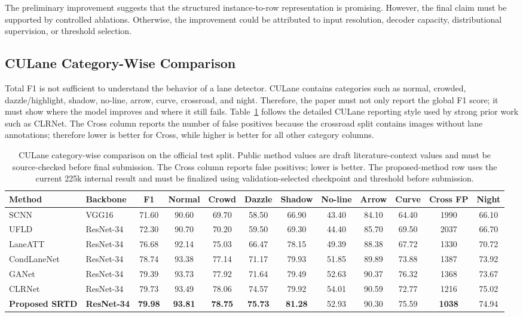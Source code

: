 \documentclass[conference]{IEEEtran}
\newcommand{\method}{SRTD}
\begin{document}
The preliminary improvement suggests that the structured instance-to-row representation is promising. However, the final claim must be supported by controlled ablations. Otherwise, the improvement could be attributed to input resolution, decoder capacity, distributional supervision, or threshold selection.

\subsection{CULane Category-Wise Comparison}

Total F1 is not sufficient to understand the behavior of a lane detector. CULane contains categories such as normal, crowded, dazzle/highlight, shadow, no-line, arrow, curve, crossroad, and night. Therefore, the paper must not only report the global F1 score; it must show where the model improves and where it still fails. Table~\ref{tab:category} follows the detailed CULane reporting style used by strong prior work such as CLRNet. The Cross column reports the number of false positives because the crossroad split contains images without lane annotations; therefore lower is better for Cross, while higher is better for all other category columns.

\begin{table}[t]
\centering
\caption{CULane category-wise comparison on the official test split. Public method values are draft literature-context values and must be source-checked before final submission. The Cross column reports false positives; lower is better. The proposed-method row uses the current 225k internal result and must be finalized using validation-selected checkpoint and threshold before submission.}
\label{tab:category}
\scriptsize
\setlength{\tabcolsep}{2.5pt}
\begin{tabular}{llcccccccccc}
\toprule
Method & Backbone & F1 & Normal & Crowd & Dazzle & Shadow & No-line & Arrow & Curve & Cross FP & Night \\
\midrule
SCNN & VGG16 & 71.60 & 90.60 & 69.70 & 58.50 & 66.90 & 43.40 & 84.10 & 64.40 & 1990 & 66.10 \\
UFLD & ResNet-34 & 72.30 & 90.70 & 70.20 & 59.50 & 69.30 & 44.40 & 85.70 & 69.50 & 2037 & 66.70 \\
LaneATT & ResNet-34 & 76.68 & 92.14 & 75.03 & 66.47 & 78.15 & 49.39 & 88.38 & 67.72 & 1330 & 70.72 \\
CondLaneNet & ResNet-34 & 78.74 & 93.38 & 77.14 & 71.17 & 79.93 & 51.85 & 89.89 & 73.88 & 1387 & 73.92 \\
GANet & ResNet-34 & 79.39 & 93.73 & 77.92 & 71.64 & 79.49 & 52.63 & 90.37 & 76.32 & 1368 & 73.67 \\
CLRNet & ResNet-34 & 79.73 & 93.49 & 78.06 & 74.57 & 79.92 & 54.01 & 90.59 & 72.77 & 1216 & 75.02 \\
\textbf{Proposed \method} & \textbf{ResNet-34} & \textbf{79.98} & \textbf{93.81} & \textbf{78.75} & \textbf{75.73} & \textbf{81.28} & 52.93 & 90.30 & 75.59 & \textbf{1038} & 74.94 \\
\bottomrule
\end{tabular}
\end{table}
\end{document}
